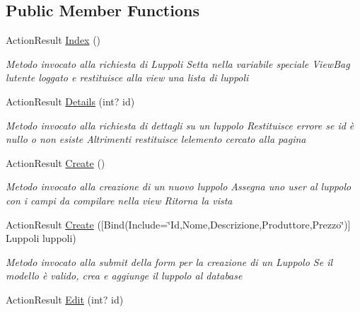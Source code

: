 \subsection*{Public Member Functions}
\begin{DoxyCompactItemize}
\item 
Action\+Result \mbox{\hyperlink{class_brew_day2_1_1_controllers_1_1_luppoli_controller_a70b87982bc0a3e78433c6a3541377dbe}{Index}} ()
\begin{DoxyCompactList}\small\item\em Metodo invocato alla richiesta di Luppoli Setta nella variabile speciale View\+Bag l\textquotesingle{}utente loggato e restituisce alla view una lista di luppoli \end{DoxyCompactList}\item 
Action\+Result \mbox{\hyperlink{class_brew_day2_1_1_controllers_1_1_luppoli_controller_a18d3d1c67b44d7e1dca624e8a4e24f99}{Details}} (int? id)
\begin{DoxyCompactList}\small\item\em Metodo invocato alla richiesta di dettagli su un luppolo Restituisce errore se id è nullo o non esiste Altrimenti restituisce l\textquotesingle{}elemento cercato alla pagina \end{DoxyCompactList}\item 
Action\+Result \mbox{\hyperlink{class_brew_day2_1_1_controllers_1_1_luppoli_controller_a99fc0a945f154ffc4c0313a45cd559c2}{Create}} ()
\begin{DoxyCompactList}\small\item\em Metodo invocato alla creazione di un nuovo luppolo Assegna uno user al luppolo con i campi da compilare nella view Ritorna la vista \end{DoxyCompactList}\item 
Action\+Result \mbox{\hyperlink{class_brew_day2_1_1_controllers_1_1_luppoli_controller_a46c6d9eb7c90e6087a7ec410d6823413}{Create}} (\mbox{[}Bind(Include=\char`\"{}Id,Nome,Descrizione,Produttore,Prezzo\char`\"{})\mbox{]} Luppoli luppoli)
\begin{DoxyCompactList}\small\item\em Metodo invocato alla submit della form per la creazione di un Luppolo Se il modello è valido, crea e aggiunge il luppolo al database \end{DoxyCompactList}\item 
Action\+Result \mbox{\hyperlink{class_brew_day2_1_1_controllers_1_1_luppoli_controller_a22134f379cb303fbb319310cb41fe259}{Edit}} (int? id)

\end{DoxyCompactItemize}

